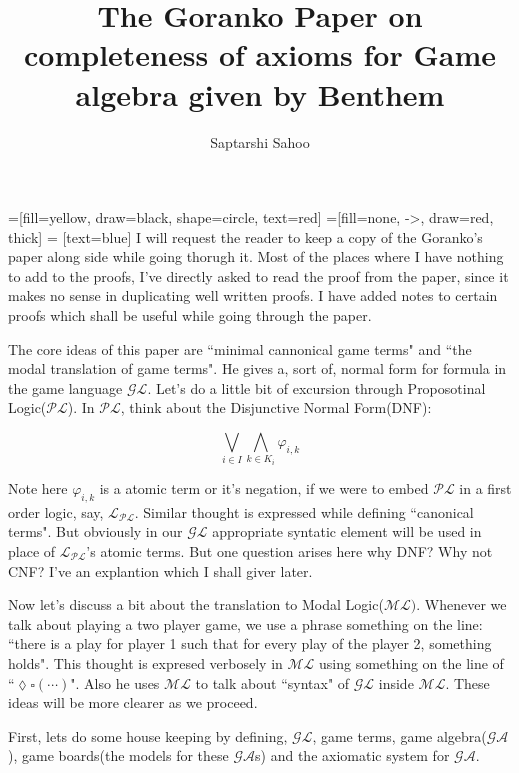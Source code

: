 \documentclass[10pt]{article}
\title{The \textbf{Goranko Paper} on completeness of axioms for Game algebra given by Benthem}
\author{Saptarshi Sahoo}
\renewcommand{\phi}{\varphi}
\newcommand{\move}{\lozenge}
\newcommand{\Move}{\square}
\newcommand{\pl}{\mathcal{PL}}
\newcommand{\gl}{\mathcal{GL}}
\newcommand{\ml}{\mathcal{ML}}
\newcommand{\ga}{\mathcal{GA}}
\renewcommand{\L}{\mathcal{L}}
\begin{document}
	\maketitle
	
	=[fill=yellow, draw=black, shape=circle, text=red]
	=[fill=none, ->, draw=red, thick]
	 = [text=blue]
	I will request the reader to keep a copy of the Goranko's paper along side while going thorugh it. Most of the places where I have nothing to add to the proofs, I've directly asked to read the proof from the paper, since it makes no sense in duplicating well written proofs. I have added notes to certain proofs which shall be useful while going through the paper. 
	
	The core ideas of this paper are ``minimal cannonical game terms" and ``the modal translation of game terms". He gives a, sort of, normal form for formula in the game language $\gl$. Let's do a little bit of excursion through Proposotinal Logic($\pl$). In $\pl$, think about the Disjunctive Normal Form(DNF):
	
	\begin{equation}
	\bigvee_{i\in I} \bigwedge_{k \in K_i} \phi_{i,k}
	\end{equation}
	
	Note here $\phi_{i,k}$ is a atomic term or it's negation, if we were to embed $\pl$ in a first order logic, say, $\L_{\pl}$. Similar thought is expressed while defining ``canonical terms". But obviously in our $\gl$ appropriate syntatic element will be used in place of $\L_\pl$'s atomic terms. But one question arises here why DNF? Why not CNF? I've an explantion which I shall giver later. 
	
	Now let's discuss a bit about the translation to Modal Logic($\ml)$. Whenever we talk about playing a two player game, we use a phrase something on the line: ``there is a play for player 1 such that for every play of the player 2, something holds". This thought is expresed verbosely in $\ml$ using something on the line of ``$\move\Move(\cdots)$". Also he uses $\ml$ to talk about ``syntax" of $\gl$ inside $\ml$. These ideas will be more clearer as we proceed.
	
	First, lets do some house keeping by defining, $\gl$, game terms, game algebra($\ga$), game boards(the models for these $\ga$s) and the axiomatic system for $\ga$. 
	
\end{document}
